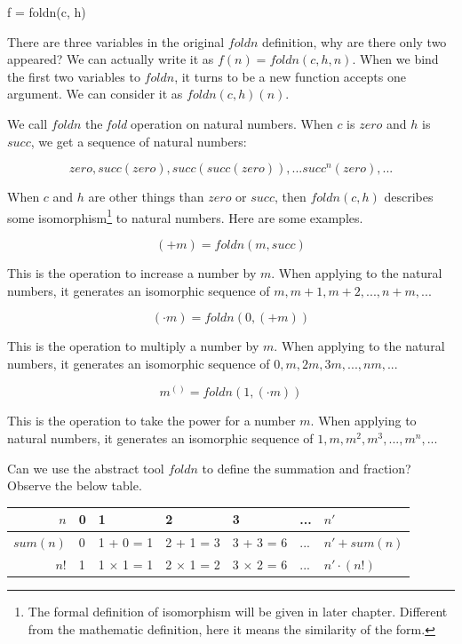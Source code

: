 \documentclass[UTF8]{article}
\begin{document}
\be
f = foldn(c, h)
\ee

There are three variables in the original $foldn$ definition, why are there only two appeared? We can actually write it as $f(n) = foldn(c, h, n)$. When we bind the first two variables to $foldn$, it turns to be a new function accepts one argument. We can consider it as $foldn(c, h)(n)$.

We call $foldn$ the {\em fold} operation on natural numbers. When $c$ is $zero$ and $h$ is $succ$, we get a sequence of natural numbers:

\[
zero, succ(zero), succ(succ(zero)), ... succ^n(zero), ...
\]

When $c$ and $h$ are other things than $zero$ or $succ$, then $foldn(c, h)$ describes some isomorphism\footnote{The formal definition of isomorphism will be given in later chapter. Different from the mathematic definition, here it means the similarity of the form.} to natural numbers. Here are some examples.

\[
(+ m) = foldn(m, succ)
\]

This is the operation to increase a number by $m$. When applying to the natural numbers, it generates an isomorphic sequence of $m, m + 1, m + 2, ..., n + m, ...$

\[
(\cdot m) = foldn(0, (+ m))
\]

This is the operation to multiply a number by $m$. When applying to the natural numbers, it generates an isomorphic sequence of $0, m, 2m, 3m, ..., nm, ...$

\[
m^{()} = foldn(1, (\cdot m))
\]

This is the operation to take the power for a number $m$. When applying to natural numbers, it generates an isomorphic sequence of $1, m, m^2, m^3, ..., m^n, ...$

Can we use the abstract tool $foldn$ to define the summation and fraction? Observe the below table.

\vspace{5mm}

\begin{tabular}{r|l|l|l|l|l|l}
$n$ & 0 & 1 & 2 & 3 & ... & $n'$ \\
\hline
$sum(n)$ & 0 & 1 + 0 = 1 & 2 + 1 = 3 & 3 + 3 = 6 & ... & $n' + sum(n)$ \\
\hline
$n!$ & 1 & 1 $\times$ 1 = 1 & 2 $\times$ 1 = 2 & 3 $\times$ 2 = 6 & ... & $n' \cdot (n!)$
\end{tabular}

\vspace{5mm}
\end{document}

